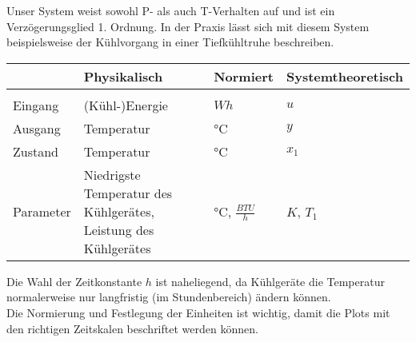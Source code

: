 Unser System weist sowohl P- als auch T-Verhalten auf und ist ein Verzögerungsglied 1. Ordnung. In der Praxis lässt sich mit diesem System beispielsweise der Kühlvorgang in einer Tiefkühltruhe beschreiben.

\vspace*{0.5cm}
\begin{center}
  \begin{tabular}{l| |l|l|l}
    & Physikalisch & Normiert   & Systemtheoretisch \\\hline\hline
    & & & \\
    Eingang   & (Kühl-)Energie  & $Wh$ & $u$ \\
    Ausgang   & Temperatur      & °C                & $y$ \\
    Zustand   & Temperatur      & °C                & $x_{1}$ \\
    Parameter & \makecell[l]{Niedrigste Temperatur des\\ Kühlgerätes,\\Leistung des Kühlgerätes}                & °C, $\frac{BTU}{h}$    & $K$, $T_{1}$ \\
  \end{tabular}
\end{center}
\vspace*{0.5cm}
\noindent{}Die Wahl der Zeitkonstante $h$ ist naheliegend, da Kühlgeräte die Temperatur normalerweise nur langfristig (im Stundenbereich) ändern können.\\
Die Normierung und Festlegung der Einheiten ist wichtig, damit die Plots mit den richtigen Zeitskalen beschriftet werden können.





